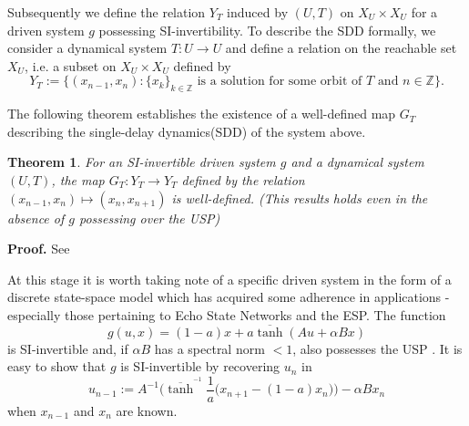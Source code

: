 \documentclass[a4paper,12pt,twoside]{report}
\newtheorem{Theorem}{Theorem}[]
\begin{document}
Subsequently we define the relation $Y_T$ induced by $(U,T)$ on $X_U\times{X_U}$ for a driven system $g$ possessing SI-invertibility.  
To describe the  SDD formally, we consider a dynamical system $T: U \to U$ and define a relation on the reachable set $X_U$, i.e. a subset on $X_U \times X_U$  defined by 
$$Y_T:=\{(x_{n-1},x_n): \{x_k\}_{k\in \mathbb{Z}} \mbox{ is a solution for some orbit of } T \mbox{ and } n \in \mathbb{Z}\}.$$ 

The following theorem establishes the existence of a well-defined map $G_T$ describing the single-delay dynamics(SDD) of the system above. 

\begin{Theorem}\label{Thm_GT_Exists}
  For an SI-invertible driven system $g$ and a dynamical system $(U,T)$, the map $G_T: Y_T \to Y_T$ defined by the relation $(x_{n-1},x_n) \mapsto (x_n,x_{n+1})$ is well-defined. 
  (This results holds even in the absence of $g$ possessing over the USP) 
  \end{Theorem}
  {\bf Proof.} See~\cite[Th.3]{Supp}



At this stage it is worth taking note of a specific driven system in the form of a discrete state-space model which has acquired some adherence in applications \cite{Manju_IEEE}- especially those pertaining to Echo State Networks and the ESP. The function 
\begin{equation}  \label{eqn_driving}
  g(u,x) = (1-a)x + a\overline{\tanh}(Au + \alpha Bx)
\end{equation} 
is SI-invertible and, if $\alpha B$ has a spectral norm $<1$, also possesses the USP \cite[Th.2]{manjunath2013echo }. 
It is easy to show that $g$ is SI-invertible by recovering $u_n$ in 
\begin{equation} \label{eqn_SI_RNN}
  u_{n-1} := A^{-1}\bigg(\overline{\tanh}^{^{-1}}\frac{1}{a}\Big(x_{n+1}-(1-a)x_n\Big) \bigg) - \alpha B x_n
  \end{equation}
  when $x_{n-1}$ and $x_n$ are known.
\end{document}
